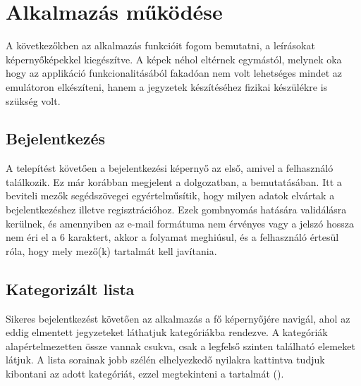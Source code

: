 \chapter{Alkalmazás működése}

A következőkben az alkalmazás funkcióit fogom bemutatni, a leírásokat képernyőképekkel kiegészítve. A képek néhol eltérnek egymástól, melynek oka hogy az applikáció funkcionalitásából fakadóan nem volt lehetséges mindet az emulátoron elkészíteni, hanem a jegyzetek készítéséhez fizikai készülékre is szükség volt.

\section{Bejelentkezés}
A telepítést követően a bejelentkezési képernyő az első, amivel a felhasználó találkozik. Ez már korábban megjelent a dolgozatban, a  bemutatásában. Itt a beviteli mezők segédszövegei egyértelműsítik, hogy milyen adatok elvártak a bejelentkezéshez illetve regisztrációhoz. Ezek gombnyomás hatására validálásra kerülnek, és amennyiben az e-mail formátuma nem érvényes vagy a jelszó hossza nem éri el a 6 karaktert, akkor a folyamat meghiúsul, és a felhasználó értesül róla, hogy mely mező(k) tartalmát kell javítania.

\section{Kategorizált lista}
Sikeres bejelentkezést követően az alkalmazás a fő képernyőjére navigál, ahol az eddig elmentett jegyzeteket láthatjuk kategóriákba rendezve. A kategóriák alapértelmezetten össze vannak csukva, csak a legfelső szinten található elemeket látjuk. A lista sorainak jobb szélén elhelyezkedő nyilakra kattintva tudjuk kibontani az adott kategóriát, ezzel megtekinteni a tartalmát ().

